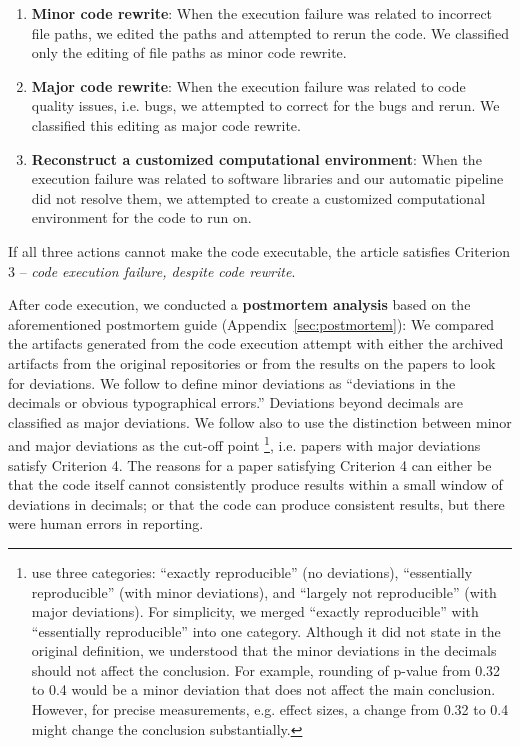 \begin{enumerate}
    \item \textbf{Minor code rewrite}: When the execution failure was related to incorrect file paths, we edited the paths and attempted to rerun the code. We classified only the editing of file paths as minor code rewrite.
    \item \textbf{Major code rewrite}: When the execution failure was related to code quality issues, i.e. bugs, we attempted to correct for the bugs and rerun. We classified this editing as major code rewrite.
    \item \textbf{Reconstruct a customized computational environment}: When the execution failure was related to software libraries and our automatic pipeline did not resolve them, we attempted to create a customized computational environment for the code to run on. 
\end{enumerate}

If all three actions cannot make the code executable, the article satisfies Criterion 3 -- \textit{code execution failure, despite code rewrite}.


After code execution, we conducted a \textbf{postmortem analysis} based on the aforementioned postmortem guide (Appendix~\ref{sec:postmortem}):
We compared the artifacts generated from the code execution attempt with either the archived artifacts from the original repositories or from the results on the papers to look for deviations. We follow \textcite{cruewell:2023:WB} to define minor deviations as ``deviations in the decimals or obvious typographical errors.'' Deviations beyond decimals are classified as major deviations. We follow also \textcite{cruewell:2023:WB} to use the distinction between minor and major deviations as the cut-off point \footnote{\textcite{cruewell:2023:WB} use three categories: ``exactly reproducible'' (no deviations), ``essentially reproducible'' (with minor deviations), and ``largely not reproducible'' (with major deviations). For simplicity, we merged ``exactly reproducible'' with ``essentially reproducible'' into one category. Although it did not state in the original definition, we understood that the minor deviations in the decimals should not affect the conclusion. For example, rounding of p-value from 0.32 to 0.4 would be a minor deviation that does not affect the main conclusion. However, for precise measurements, e.g. effect sizes, a change from 0.32 to 0.4 might change the conclusion substantially.}, i.e. papers with major deviations satisfy Criterion 4. The reasons for a paper satisfying Criterion 4 can either be that the code itself cannot consistently produce results within a small window of deviations in decimals; or that the code can produce consistent results, but there were human errors in reporting.


